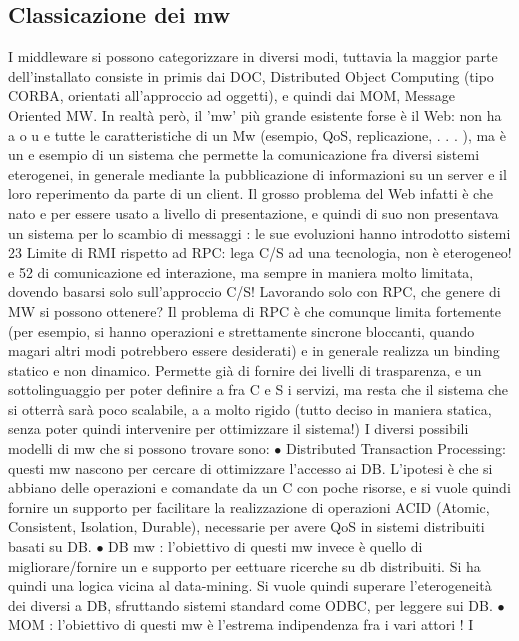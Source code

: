 \documentclass[a4paper,12pt]{article}
\begin{document}
\subsection{Classicazione dei mw}
I middleware si possono categorizzare in diversi modi, tuttavia la maggior parte
dell'installato consiste in primis dai DOC, Distributed Object Computing (tipo
CORBA, orientati all'approccio ad oggetti), e quindi dai MOM, Message Oriented MW. In realtà però, il 'mw' più grande
esistente forse è il Web: non ha
a
o
u
e
tutte le caratteristiche di un Mw (esempio, QoS, replicazione, . . . ), ma è un
e
esempio di un sistema che permette la comunicazione fra diversi sistemi eterogenei, in generale mediante la
pubblicazione di informazioni su un server e il loro
reperimento da parte di un client. Il grosso problema del Web infatti è che nato
e
per essere usato a livello di presentazione, e quindi di suo non presentava un
sistema per lo scambio di messaggi : le sue evoluzioni hanno introdotto sistemi
23 Limite
di RMI rispetto ad RPC: lega C/S ad una tecnologia, non è eterogeneo!
e
52
di comunicazione ed interazione, ma sempre in maniera molto limitata, dovendo
basarsi solo sull'approccio C/S!
Lavorando solo con RPC, che genere di MW si possono ottenere? Il problema
di RPC è che comunque limita fortemente (per esempio, si hanno operazioni
e
strettamente sincrone bloccanti, quando magari altri modi potrebbero essere
desiderati) e in generale realizza un binding statico e non dinamico. Permette
già di fornire dei livelli di trasparenza, e un sottolinguaggio per poter definire
a
fra C e S i servizi, ma resta che il sistema che si otterrà sarà poco scalabile,
a
a
molto rigido (tutto deciso in maniera statica, senza poter quindi intervenire per
ottimizzare il sistema!)
I diversi possibili modelli di mw che si possono trovare sono:
$\bullet$ Distributed Transaction Processing: questi mw nascono per cercare di
ottimizzare l'accesso ai DB. L'ipotesi è che si abbiano delle operazioni
e
comandate da un C con poche risorse, e si vuole quindi fornire un supporto
per facilitare la realizzazione di operazioni ACID (Atomic, Consistent,
Isolation, Durable), necessarie per avere QoS in sistemi distribuiti basati
su DB.
$\bullet$ DB mw : l'obiettivo di questi mw invece è quello di migliorare/fornire un
e
supporto per eettuare ricerche su db distribuiti. Si ha quindi una logica
vicina al data-mining. Si vuole quindi superare l'eterogeneità dei diversi
a
DB, sfruttando sistemi standard come ODBC, per leggere sui DB.
$\bullet$ MOM : l'obiettivo di questi mw è l'estrema indipendenza fra i vari attori ! I
\end{document}
